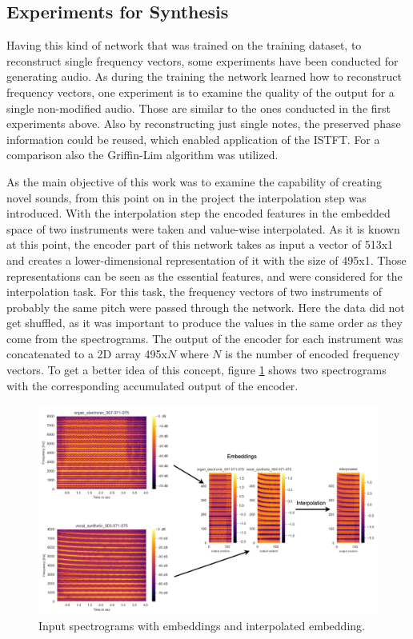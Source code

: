 \subsection{Experiments for Synthesis}
Having this kind of network that was trained on the training dataset, to reconstruct single frequency vectors, some experiments have been conducted for generating audio. As during the training the network learned how to reconstruct frequency vectors, one experiment is to examine the quality of the output for a single non-modified audio. Those are similar to the ones conducted in the first experiments above. Also by reconstructing just single notes, the preserved phase information could be reused, which enabled application of the ISTFT. For a comparison also the Griffin-Lim algorithm was utilized.

As the main objective of this work was to examine the capability of creating novel sounds, from this point on in the project the interpolation step was introduced. With the interpolation step the encoded features in the embedded space of two instruments were taken and value-wise interpolated. As it is known at this point, the encoder part of this network takes as input a vector of 513x1 and creates a lower-dimensional representation of it with the size of 495x1. Those representations can be seen as the essential features, and were considered for the interpolation task. For this task, the frequency vectors of two instruments of probably the same pitch were passed through the network. Here the data did not get shuffled, as it was important to produce the values in the same order as they come from the spectrograms. The output of the encoder for each instrument was concatenated to a 2D array 495x$N$ where $N$ is the number of encoded frequency vectors. To get a better idea of this concept, figure \ref{fig:exp_spec_emb_int_1D} shows two spectrograms with the corresponding accumulated output of the encoder.\\ 

 \begin{figure}[htb!]
	\caption{Input spectrograms with embeddings and interpolated embedding.}
	\label{fig:exp_spec_emb_int_1D}
	\centering
	\includegraphics[width=\textwidth]{images/experiments/spec_to_emb.png}
\end{figure}

